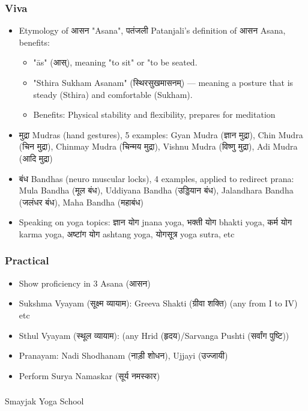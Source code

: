 \begin{frame}[fragile]\frametitle{Viva}
\begin{itemize}
\item Etymology of आसन "Asana", पतंजली Patanjali's definition of आसन Asana, benefits: 
			\begin{itemize}
			\item "ās" (आस्), meaning "to sit" or "to be seated.
			\item "Sthira Sukham Asanam" (स्थिरसुखमासनम्) — meaning a posture that is steady (Sthira) and comfortable (Sukham).
			\item Benefits: Physical stability and flexibility, prepares for meditation
		\end{itemize}			
\item मुद्रा  Mudras (hand gestures), 5 examples: Gyan Mudra (ज्ञान मुद्रा), Chin Mudra (चिन मुद्रा), Chinmay Mudra (चिन्मय मुद्रा), Vishnu Mudra (विष्णु मुद्रा), Adi Mudra (आदि मुद्रा)
\item बंध  Bandhas (neuro muscular locks), 4 examples, applied to redirect prana: Mula Bandha (मूल बंध), Uddiyana Bandha (उड्डियान बंध), Jalandhara Bandha (जलंधर बंध), Maha Bandha (महाबंध)
\item Speaking on yoga topics: ज्ञान योग  jnana yoga, भक्ती योग  bhakti yoga, कर्म योग  karma yoga, अष्टांग योग  ashtang yoga, योगसूत्र yoga sutra, etc
\end{itemize}
\end{frame}

\begin{frame}[fragile]\frametitle{Practical}
	\begin{itemize}
	\item Show proficiency in 3 Asana (आसन)
    \item Sukshma Vyayam (सूक्ष्म व्यायाम): Greeva Shakti (ग्रीवा शक्ति) (any from I to IV) etc
    \item Sthul Vyayam (स्थूल व्यायाम): (any Hrid (हृदय)/Sarvanga Pushti (सर्वांग पुष्टि))
	\item Pranayam: Nadi Shodhanam (नाड़ी शोधन), Ujjayi (उज्जायी)
	\item Perform Surya Namaskar (सूर्य नमस्कार)
	\end{itemize}
\end{frame}


\begin{frame}[fragile]\frametitle{}
\begin{center}
{\Large Smayjak Yoga School}
\end{center}
\end{frame}

